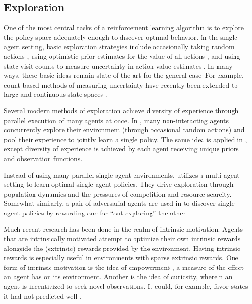 \documentclass[11pt,journal,compsoc]{IEEEtran}
\begin{document}
	\subsection{Exploration}
	One of the most central tasks of a reinforcement learning algorithm is to explore the policy space adequately enough to discover optimal behavior. In the single-agent setting, basic exploration strategies include occasionally taking random actions \cite{eps_greedy}, using optimistic prior estimates for the value of all actions \cite{optimistic_initialization}, and using state visit counts to measure uncertainty in action value estimates \cite{ucb}. In many ways, these basic ideas remain state of the art for the general case. For example, count-based methods of measuring uncertainty have recently been extended to large and continuous state spaces \cite{hashing} \cite{pseudo_counts}.
	
	Several modern methods of exploration achieve diversity of experience through parallel execution of many agents at once. In \cite{a3c}, many non-interacting agents concurrently explore their environment (through occasional random actions) and pool their experience to jointly learn a single policy. The same idea is applied in \cite{seed_sampling}, except diversity of experience is achieved by each agent receiving unique priors and observation functions. 
	
	Instead of using many parallel single-agent environments, \cite{malthusian_rl} utilizes a multi-agent setting to learn optimal single-agent policies. They drive exploration through population dynamics and the pressures of competition and resource scarcity. Somewhat similarly, a pair of adversarial agents are used in \cite{asymmetric_selfplay} to discover single-agent policies by rewarding one for ``out-exploring'' the other. 
	
	Much recent research has been done in the realm of intrinsic motivation. Agents that are intrinsically motivated attempt to optimize their own intrinsic rewards alongside the (extrinsic) rewards provided by the environment. Having intrinsic rewards is especially useful in environments with sparse extrinsic rewards. One form of intrinsic motivation is the idea of empowerment \cite{empowerment}, a measure of the effect an agent has on its environment. Another is the idea of curiosity, wherein an agent is incentivized to seek novel observations. It could, for example, favor states it had not predicted well \cite{prediction_error}.
	
\end{document}
